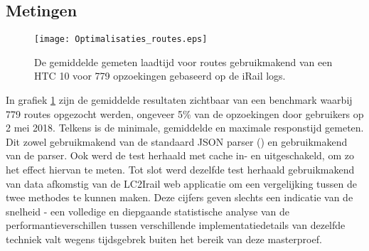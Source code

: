 \subsection{Metingen}
\begin{figure}[h]
	\centering
	\texttt{[image: Optimalisaties\_routes.eps]}
	\caption[Gemeten laadtijd routes]{De gemiddelde gemeten laadtijd voor routes gebruikmakend van een HTC 10 voor 779 opzoekingen gebaseerd op de iRail logs.}
	\label{fig:routelabtest}
\end{figure}
%		

In grafiek \ref{fig:routelabtest} zijn de gemiddelde resultaten zichtbaar van een benchmark waarbij 779 routes opgezocht werden, ongeveer 5\% van de opzoekingen door gebruikers op 2 mei 2018. Telkens is de minimale, gemiddelde en maximale responstijd gemeten. Dit zowel gebruikmakend van de standaard JSON parser () en gebruikmakend van de  parser. Ook werd de test herhaald met cache in- en uitgeschakeld, om zo het effect hiervan te meten. Tot slot werd dezelfde test herhaald gebruikmakend van data afkomstig van de LC2Irail web applicatie om een vergelijking tussen de twee methodes te kunnen maken. Deze cijfers geven slechts een indicatie van de snelheid - een volledige en diepgaande statistische analyse van de performantieverschillen tussen verschillende implementatiedetails van dezelfde techniek valt wegens tijdsgebrek buiten het bereik van deze masterproef.


